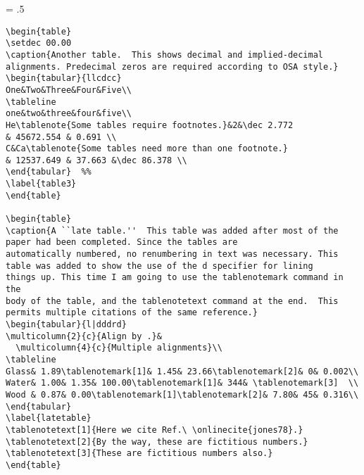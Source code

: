 \newpage
\baselineskip = .5\baselineskip  %
\begin{verbatim}
\begin{table}
\setdec 00.00
\caption{Another table.  This shows decimal and implied-decimal
alignments. Predecimal zeros are required according to OSA style.}
\begin{tabular}{llcdcc}
One&Two&Three&Four&Five\\
\tableline
one&two&three&four&five\\
He\tablenote{Some tables require footnotes.}&2&\dec 2.772
& 45672.554 & 0.691 \\
C&Ca\tablenote{Some tables need more than one footnote.}
& 12537.649 & 37.663 &\dec 86.378 \\
\end{tabular}  %%
\label{table3}
\end{table}

\begin{table}
\caption{A ``late table.''  This table was added after most of the
paper had been completed. Since the tables are
automatically numbered, no renumbering in text was necessary. This
table was added to show the use of the d specifier for lining
things up. This time I am going to use the tablenotemark command in the
body of the table, and the tablenotetext command at the end.  This
permits multiple citations of the same reference.}
\begin{tabular}{l|dddrd}
\multicolumn{2}{c}{Align by .}&
  \multicolumn{4}{c}{Multiple alignments}\\
\tableline
Glass& 1.89\tablenotemark[1]& 1.45& 23.66\tablenotemark[2]& 0& 0.002\\
Water& 1.00& 1.35& 100.00\tablenotemark[1]& 344& \tablenotemark[3]  \\
Wood & 0.87& 0.00\tablenotemark[1]\tablenotemark[2]& 7.80& 45& 0.316\\
\end{tabular}
\label{latetable}
\tablenotetext[1]{Here we cite Ref.\ \onlinecite{jones78}.}
\tablenotetext[2]{By the way, these are fictitious numbers.}
\tablenotetext[3]{These are fictitious numbers also.}
\end{table}

\end{verbatim} \newpage

